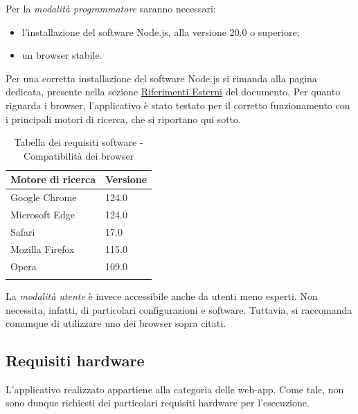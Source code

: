     \bigskip
    \noindent Per la \textit{modalità programmatore} saranno necessari: 
    \begin{itemize}
        \item l'installazione del software Node.js, alla versione 20.0 o superiore;
        \item un browser stabile. 
    \end{itemize}
    Per una corretta installazione del software Node.js si rimanda alla pagina dedicata, presente nella sezione \hyperref[sec:riferimenti_esterni]{Riferimenti Esterni} del documento. 
    Per quanto riguarda i browser, l'applicativo è stato testato per il corretto funzionamento con i principali motori di ricerca, che si riportano qui sotto.
    \renewcommand{\arraystretch}{1.5}
    \begin{xltabular}{\textwidth}{ X | X}

        \textbf{\color{white} Motore di ricerca} & \textbf{\color{white} Versione}\\ 
        \hline
        \endhead

        Google Chrome & 124.0 \\
        \hline

        Microsoft Edge & 124.0 \\
        \hline
        
        Safari & 17.0 \\
        \hline

        Mozilla Firefox & 115.0 \\
        \hline

        Opera & 109.0 \\
        \hline
        
        \caption{Tabella dei requisiti software - Compatibilità dei browser}
        \label{tab:requisiti:soft}
    \end{xltabular}
    \noindent La \textit{modalità utente} è invece accessibile anche da utenti meno esperti. Non necessita, infatti, di particolari configurazioni e software. Tuttavia, si raccomanda 
    comunque di utilizzare uno dei browser sopra citati. \\



    \subsection{Requisiti hardware}\label{sec:requisiti_e_compatibilità:hardware}
    L'applicativo realizzato appartiene alla categoria delle web-app. Come tale, non sono dunque richiesti dei particolari requisiti hardware per l'esecuzione.
    
